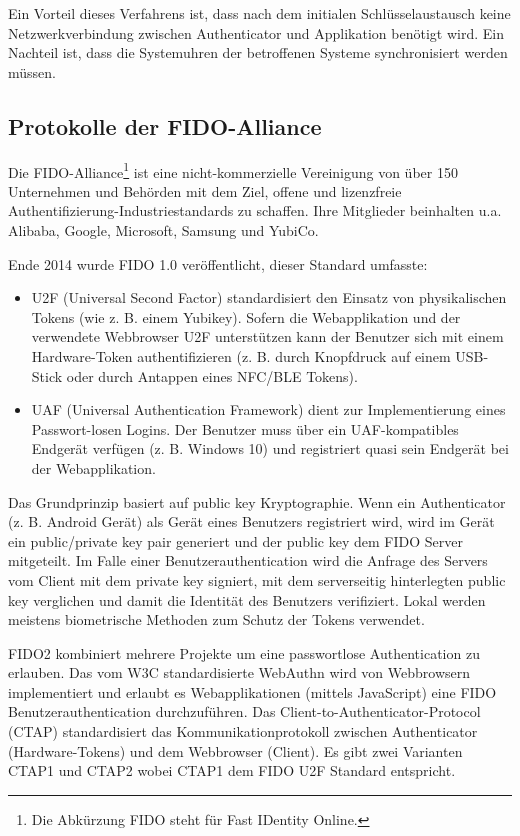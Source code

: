 Ein Vorteil dieses Verfahrens ist, dass nach dem initialen Schlüsselaustausch keine Netzwerkverbindung zwischen Authenticator und Applikation benötigt wird. Ein Nachteil ist, dass die Systemuhren der betroffenen Systeme synchronisiert werden müssen.

\subsection{Protokolle der FIDO-Alliance}

Die FIDO-Alliance\footnote{Die Abkürzung FIDO steht für Fast IDentity Online.} ist eine nicht-kommerzielle Vereinigung von über 150 Unternehmen und Behörden mit dem Ziel, offene und lizenzfreie Authentifizierung-Industriestandards zu schaffen. Ihre Mitglieder beinhalten u.a. Alibaba, Google, Microsoft, Samsung und YubiCo.

Ende 2014 wurde FIDO 1.0 veröffentlicht, dieser Standard umfasste:

\begin{itemize}
	\item U2F (Universal Second Factor) standardisiert den Einsatz von physikalischen Tokens (wie z. B. einem Yubikey). Sofern die Webapplikation und der verwendete Webbrowser U2F unterstützen kann der Benutzer sich mit einem Hardware-Token authentifizieren (z. B. durch Knopfdruck auf einem USB-Stick oder durch Antappen eines NFC/BLE Tokens).
	\item UAF (Universal Authentication Framework) dient zur Implementierung eines Passwort-losen Logins. Der Benutzer muss über ein UAF-kompatibles Endgerät verfügen (z. B. Windows 10) und registriert quasi sein Endgerät bei der Webapplikation.
\end{itemize}

Das Grundprinzip basiert auf public key Kryptographie. Wenn ein Authenticator (z. B. Android Gerät) als Gerät eines Benutzers registriert wird, wird im Gerät ein public/private key pair generiert und der public key dem FIDO Server mitgeteilt. Im Falle einer Benutzerauthentication wird die Anfrage des Servers vom Client mit dem private key signiert, mit dem serverseitig hinterlegten public key verglichen und damit die Identität des Benutzers verifiziert. Lokal werden meistens biometrische Methoden zum Schutz der Tokens verwendet.

FIDO2 kombiniert mehrere Projekte um eine passwortlose Authentication zu erlauben. Das vom W3C standardisierte WebAuthn wird von Webbrowsern implementiert und erlaubt es Webapplikationen (mittels JavaScript) eine FIDO Benutzerauthentication durchzuführen. Das Client-to-Authenticator-Protocol (CTAP) standardisiert das Kommunikationprotokoll zwischen Authenticator (Hardware-Tokens) und dem Webbrowser (Client). Es gibt zwei Varianten CTAP1 und CTAP2 wobei CTAP1 dem FIDO U2F Standard entspricht.

